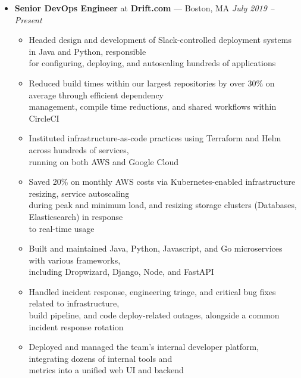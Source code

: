\documentclass{article}
\begin{document}
\begin{itemize}[label={},leftmargin=*]
  \item \textbf{Senior DevOps Engineer} at \textbf{Drift.com} --- Boston, MA \hfill {\em July 2019 -- Present}
  \begin{itemize}[label={$\bullet$}]
    \item Headed design and development of Slack-controlled deployment systems in Java and Python, responsible\\
          for configuring, deploying, and autoscaling hundreds of applications
    \item Reduced build times within our largest repositories by over 30\% on average through efficient dependency\\
          management, compile time reductions, and shared workflows within CircleCI
    \item Instituted infrastructure-as-code practices using Terraform and Helm across hundreds of services,\\
          running on both AWS and Google Cloud
    \item Saved 20\% on monthly AWS costs via Kubernetes-enabled infrastructure resizing, service autoscaling\\
          during peak and minimum load, and resizing storage clusters (Databases, Elasticsearch) in response\\
          to real-time usage
    \item Built and maintained Java, Python, Javascript, and Go microservices with various frameworks,\\ 
          including Dropwizard, Django, Node, and FastAPI
    \item Handled incident response, engineering triage, and critical bug fixes related to infrastructure,\\ 
          build pipeline, and code deploy-related outages, alongside a common incident response rotation
    \item Deployed and managed the team's internal developer platform, integrating dozens of internal tools and\\
          metrics into a unified web UI and backend
  \end{itemize}


\end{itemize}
\end{document}
